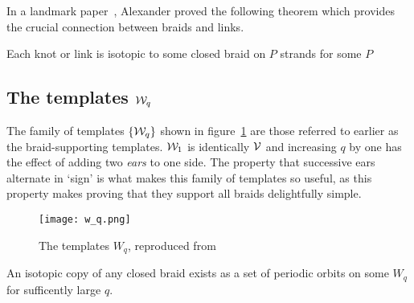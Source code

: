 \documentclass[paper.tex]{subfiles}
\begin{document}

In a landmark paper~\cite{Alexander1923}, Alexander proved the following theorem which provides the crucial connection
between braids and links.


\begin{thm}[Alexander 1923]
  Each knot or link is isotopic to some closed braid on $P$ strands for some $P$
\end{thm}

\subsection{The templates $\mathcal{W}_q$}

The family of templates $\{ \mathcal{W}_q \}$ shown in figure~\ref{fig:w_q} are those referred to earlier as the braid-supporting templates. $\mathcal{W}_1$ is identically $\mathcal{V}$ and increasing $q$ by one has the effect of adding
two \emph{ears} to one side. The property that successive ears alternate in `sign' is what makes this family of templates so useful, as this property makes proving that they support all braids delightfully simple.

\begin{figure}[h]
  \centering
  \texttt{[image: w\_q.png]}
  \caption{The templates $W_q$, reproduced from~\cite{knottyode}}\label{fig:w_q}
\end{figure}


\begin{lemma}[Ghrist 1996]
  An isotopic copy of any closed braid exists as a set of periodic orbits on some $W_q$ for sufficently large $q$.
\end{lemma}
\end{document}
